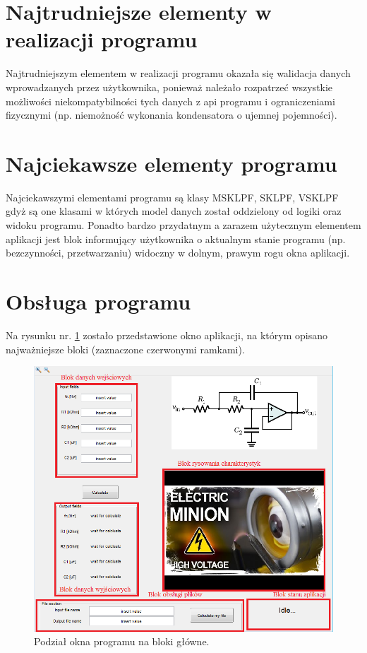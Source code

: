 \documentclass[a4paper,12pt]{article}
\begin{document}
\section{Najtrudniejsze elementy w realizacji programu}

	Najtrudniejszym elementem w realizacji programu okazała się walidacja danych
	wprowadzanych przez użytkownika, ponieważ
	należało rozpatrzeć wszystkie możliwości niekompatybilności tych danych z 
	api programu i ograniczeniami fizycznymi (np. niemożność wykonania kondensatora 
	o ujemnej pojemności).

\section{Najciekawsze elementy programu}

	Najciekawszymi elementami programu są klasy MSKLPF, SKLPF, VSKLPF gdyż
	są one klasami w których model danych został oddzielony od logiki oraz widoku
	programu. 
	Ponadto bardzo przydatnym a zarazem użytecznym elementem aplikacji jest 
	blok informujący użytkownika o aktualnym stanie programu (np. bezczynności,
	przetwarzaniu) widoczny w dolnym, prawym rogu okna aplikacji.

\section{Obsługa programu}

	Na rysunku nr. \ref{fig:bloki} zostało przedstawione okno aplikacji, na którym opisano 
	najważniejsze bloki (zaznaczone czerwonymi ramkami).
			\begin{figure}[!htbp]
 				\centering
					 \includegraphics[width=\textwidth]{../Pictures/i1.png}
 					 \caption{Podział okna programu na bloki główne.}
					 \label{fig:bloki}
			\end{figure}
\end{document}

